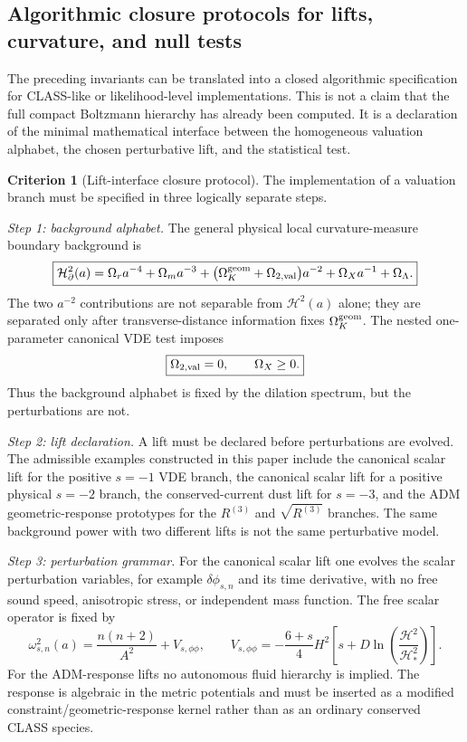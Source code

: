 \documentclass[11pt,a4paper]{article}
\def\Dil{D}%
\numberwithin{equation}{section}
\theoremstyle{definition}
\newtheorem{criterion}{Criterion}
\theoremstyle{plain}
\theoremstyle{remark}
\newcommand{\Dil}{\mathscr{D}}
\begin{document}
\subsection{Algorithmic closure protocols for lifts, curvature, and null tests}
\label{sec:algorithmic-closure-protocols}
The preceding invariants can be translated into a closed algorithmic specification for CLASS-like or likelihood-level implementations.  This is not a claim that the full compact Boltzmann hierarchy has already been computed.  It is a declaration of the minimal mathematical interface between the homogeneous valuation alphabet, the chosen perturbative lift, and the statistical test.

\begin{criterion}[Lift-interface closure protocol]
The implementation of a valuation branch must be specified in three logically separate steps.

\emph{Step 1: background alphabet.}  The general physical local curvature-measure boundary background is
\begin{equation}
\boxed{
\mathcal H^2_{\partial}(a)=
\Omega_r a^{-4}+\Omega_m a^{-3}
+\bigl(\Omega_K^{\rm geom}+\Omega_{2,\rm val}\bigr)a^{-2}
+\Omega_Xa^{-1}
+\Omega_\Lambda.
}
\end{equation}
The two \(a^{-2}\) contributions are not separable from \(\mathcal H^2(a)\) alone; they are separated only after transverse-distance information fixes \(\Omega_K^{\rm geom}\).
The nested one-parameter canonical VDE test imposes
\begin{equation}
\boxed{\Omega_{2,\rm val}=0,\qquad \Omega_X\ge0.}
\end{equation}
Thus the background alphabet is fixed by the dilation spectrum, but the perturbations are not.

\emph{Step 2: lift declaration.}  A lift must be declared before perturbations are evolved.  The admissible examples constructed in this paper include the canonical scalar lift for the positive \(s=-1\) VDE branch, the canonical scalar lift for a positive physical \(s=-2\) branch, the conserved-current dust lift for \(s=-3\), and the ADM geometric-response prototypes for the \(R^{(3)}\) and \(\sqrt{R^{(3)}}\) branches.  The same background power with two different lifts is not the same perturbative model.

\emph{Step 3: perturbation grammar.}  For the canonical scalar lift one evolves the scalar perturbation variables, for example \(\delta\phi_{s,n}\) and its time derivative, with no free sound speed, anisotropic stress, or independent mass function.  The free scalar operator is fixed by
\begin{equation}
\boxed{
\omega_{s,n}^2(a)=\frac{n(n+2)}{A^2}+V_{s,\phi\phi},
\qquad
V_{s,\phi\phi}
=-\frac{6+s}{4}H^2
\left[s+\Dil\ln\left(\frac{\mathcal H^2}{\mathcal H_*^2}\right)\right].
}
\end{equation}
For the ADM-response lifts no autonomous fluid hierarchy is implied.  The response is algebraic in the metric potentials and must be inserted as a modified constraint/geometric-response kernel rather than as an ordinary conserved CLASS species.
\end{criterion}
\end{document}

